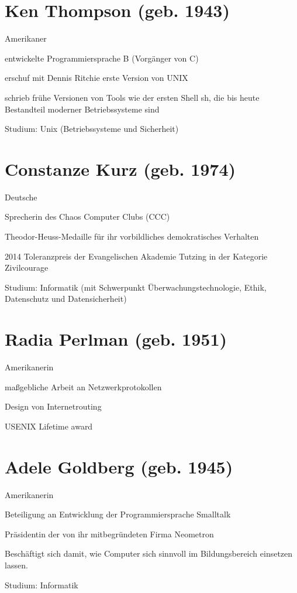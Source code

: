 \documentclass[a4paper,12pt]{scrreprt}
\begin{document}
\section*{Ken Thompson (geb. 1943)}
\begin{itemize*}
    \item Amerikaner
    \item entwickelte Programmiersprache B (Vorgänger von C)
    \item erschuf mit Dennis Ritchie erste Version von UNIX
    \item schrieb frühe Versionen von Tools wie der ersten Shell sh, die bis heute Bestandteil
          moderner Betriebssysteme sind
    \item Studium: Unix (Betriebssysteme und Sicherheit)
\end{itemize*}

\section*{Constanze Kurz (geb. 1974)}
\begin{itemize*}
    \item Deutsche
    \item Sprecherin des Chaos Computer Clubs (CCC)
    \item Theodor-Heuss-Medaille für ihr vorbildliches demokratisches Verhalten
    \item 2014 Toleranzpreis der Evangelischen Akademie Tutzing in der Kategorie Zivilcourage
    \item Studium: Informatik (mit Schwerpunkt Überwachungstechnologie, Ethik, Datenschutz und Datensicherheit)
\end{itemize*}

\section*{Radia Perlman (geb. 1951)}
\begin{itemize*}
    \item Amerikanerin
    \item maßgebliche Arbeit an Netzwerkprotokollen
    \item Design von Internetrouting
    \item USENIX Lifetime award
\end{itemize*}

\section*{Adele Goldberg (geb. 1945)}
\begin{itemize*}
    \item Amerikanerin
    \item Beteiligung an Entwicklung der Programmiersprache Smalltalk
    \item Präsidentin der von ihr mitbegründeten Firma Neometron
    \item Beschäftigt sich damit, wie Computer sich sinnvoll im Bildungsbereich einsetzen lassen.
    \item Studium: Informatik
\end{itemize*}
\end{document}
